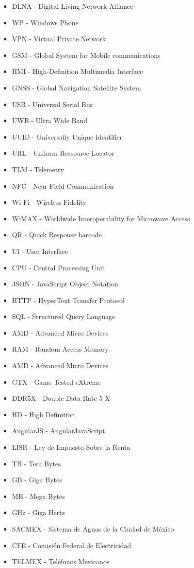 \begin{itemize}
\item DLNA - Digital Living Network Alliance
\item WP - Windows Phone
\item VPN - Virtual Private Network
\item GSM - Global System for Mobile communications
\item HMI - High-Definition Multimedia Interface
\item GNSS - Global Navigation Satellite System
\item USB - Universal Serial Bus
\item UWB - Ultra Wide Band
\item UUID - Universally Unique Identifier
\item URL - Uniform Ressource Locator
\item TLM - Telemetry
\item NFC - Near Field Communication
\item Wi-Fi - Wireless Fidelity
\item WiMAX - Worldwide Interoperability for Microwave Access
\item QR - Quick Response barcode
\item UI - User Interface
\item CPU - Central Processing Unit
\item JSON - JavaScript Object Notation
\item HTTP - HyperText Transfer Protocol
\item SQL - Structured Query Language
\item AMD - Advanced Micro Devices
\item RAM - Random Access Memory
\item AMD - Advanced Micro Devices
\item GTX - Game Tested eXtreme
\item DDR5X - Double Data Rate 5 X
\item HD - High Definition
\item AngularJS - AngularJavaScript
\item LISR - Ley de Impuesto Sobre la Renta
\item TB - Tera Bytes
\item GB - Giga Bytes
\item MB - Mega Bytes
\item GHz - Giga Hertz
\item SACMEX - Sistema de Aguas de la Ciudad de México
\item CFE - Comisión Federal de Electricidad
\item TELMEX - Teléfonos Mexicanos

\end{itemize}
